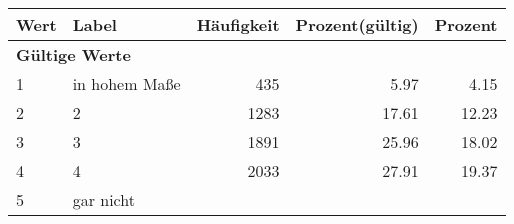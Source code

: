      \begin{longtable}{lXrrr}
     \toprule
     \textbf{Wert} & \textbf{Label} & \textbf{Häufigkeit} & \textbf{Prozent(gültig)} & \textbf{Prozent} \\
     \endhead
     \midrule
     \multicolumn{5}{l}{\textbf{Gültige Werte}}\\

     1 &
     \multicolumn{1}{X}{ in hohem Maße   } &


       \num{435} &
       \num[round-mode=places,round-precision=2]{5.97} &
         \num[round-mode=places,round-precision=2]{4.15} \\

     2 &
     \multicolumn{1}{X}{ 2   } &


       \num{1283} &
       \num[round-mode=places,round-precision=2]{17.61} &
         \num[round-mode=places,round-precision=2]{12.23} \\

     3 &
     \multicolumn{1}{X}{ 3   } &


       \num{1891} &
       \num[round-mode=places,round-precision=2]{25.96} &
         \num[round-mode=places,round-precision=2]{18.02} \\

     4 &
     \multicolumn{1}{X}{ 4   } &


       \num{2033} &
       \num[round-mode=places,round-precision=2]{27.91} &
         \num[round-mode=places,round-precision=2]{19.37} \\

     5 &
     \multicolumn{1}{X}{ gar nicht   } &



\end{longtable}
